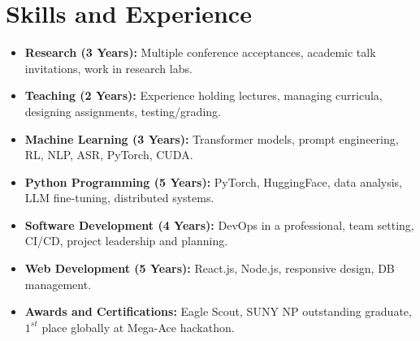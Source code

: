 \documentclass[11pt]{article}
\begin{document}
\section*{Skills and Experience}
\begin{itemize}
    \itemsep0em
    
    \item \textbf{Research (3 Years):} Multiple conference acceptances, academic talk invitations, work in research labs.
    \item \textbf{Teaching (2 Years):} Experience holding lectures, managing curricula, designing assignments, testing/grading.
    \item \textbf{Machine Learning (3 Years):} Transformer models, prompt engineering, RL, NLP, ASR, PyTorch, CUDA.
    \item \textbf{Python Programming (5 Years):} PyTorch, HuggingFace, data analysis, LLM fine-tuning, distributed systems.
    \item \textbf{Software Development (4 Years):} DevOps in a professional, team setting, CI/CD, project leadership and planning.
    \item \textbf{Web Development (5 Years):} React.js, Node.js, responsive design, DB management.
    \item \textbf{Awards and Certifications:} Eagle Scout, SUNY NP outstanding graduate, $1^{st}$ place globally at Mega-Ace hackathon.

\end{itemize}
\end{document}
